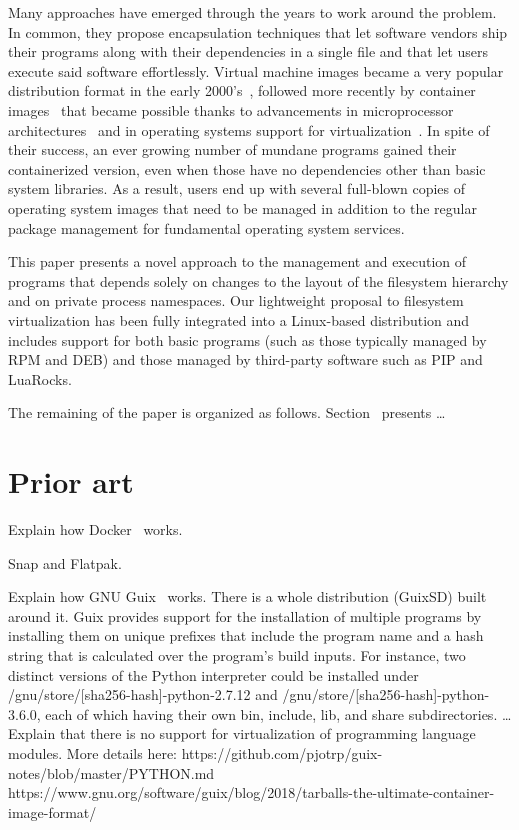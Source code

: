 Many approaches have emerged through the years to work around the problem. In common, they propose
encapsulation techniques that let software vendors ship their programs along with their dependencies
in a single file and that let users execute said software effortlessly. Virtual machine images
became a very popular distribution format in the early 2000's~\cite{Who?}, followed more recently by
container images~\cite{Docker} that became possible thanks to advancements in microprocessor
architectures~\cite{Intel} and in operating systems support for virtualization~\cite{KVM}. In spite
of their success, an ever growing number of mundane programs gained their containerized version,
even when those have no dependencies other than basic system libraries. As a result, users end up
with several full-blown copies of operating system images that need to be managed in addition to
the regular package management for fundamental operating system services.

This paper presents a novel approach to the management and execution of programs that depends
solely on changes to the layout of the filesystem hierarchy and on private process namespaces.
Our lightweight proposal to filesystem virtualization has been fully integrated into a Linux-based
distribution and includes support for both basic programs (such as those typically managed by RPM
and DEB) and those managed by third-party software such as PIP and LuaRocks.

The remaining of the paper is organized as follows. Section~ presents \ldots

\section{Prior art}
Explain how Docker~\cite{Docker} works.

Snap and Flatpak.

Explain how GNU Guix~\cite{Guix} works. There is a whole distribution (GuixSD) built around it.
Guix provides support for the installation of multiple programs by installing them on unique
prefixes that include the program name and a hash string that is calculated over the program's
build inputs. For instance, two distinct versions of the Python interpreter could be installed
under /gnu/store/[sha256-hash]-python-2.7.12 and /gnu/store/[sha256-hash]-python-3.6.0, each
of which having their own bin, include, lib, and share subdirectories. \ldots
Explain that there is no support for virtualization of programming language modules. More details
here: https://github.com/pjotrp/guix-notes/blob/master/PYTHON.md
https://www.gnu.org/software/guix/blog/2018/tarballs-the-ultimate-container-image-format/


